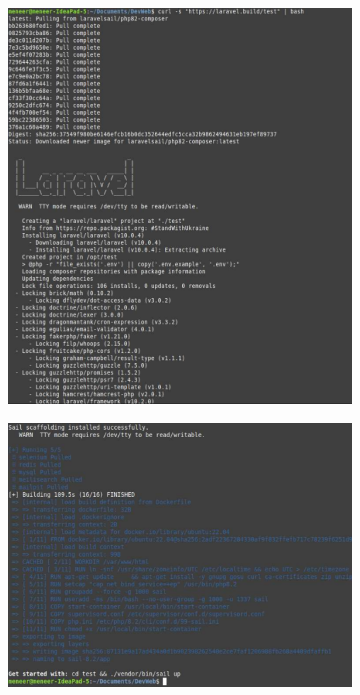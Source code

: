 \documentclass[internal]{nhitec_design}
\begin{document}
        \begin{figure}[h]
            \centering
            \begin{subfigure}{0.3\textwidth}
                \includegraphics[width=\textwidth]{Images_formation/CreateProject.pdf}
            \end{subfigure}
            \begin{subfigure}{0.3\textwidth}
                \includegraphics[width=\textwidth]{Images_formation/CreateProject2.pdf}
            \end{subfigure}
        \end{figure}
\end{document}
